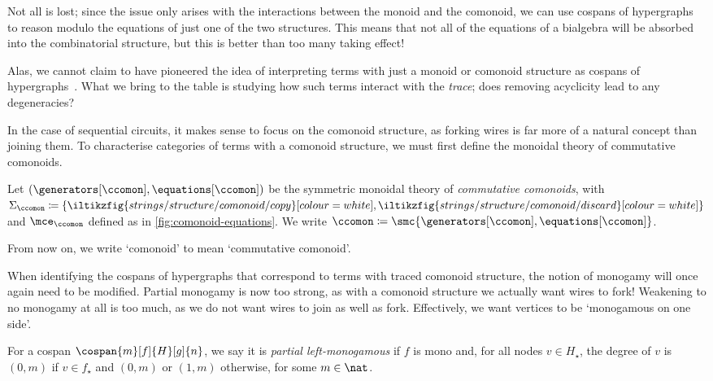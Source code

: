 Not all is lost; since the issue only arises with the interactions between the
monoid and the comonoid, we can use cospans of hypergraphs to reason modulo the
equations of just one of the two structures.
This means that not all of the equations of a bialgebra will be absorbed into
the combinatorial structure, but this is better than too many taking effect!

\begin{remark}
    Alas, we cannot claim to have pioneered the idea of interpreting terms with
    just a monoid or comonoid structure as cospans of
    hypergraphs~\cite{fritz2023free,milosavljevic2023string}.
    What we bring to the table is studying how such terms interact with the
    \emph{trace}; does removing acyclicity lead to any degeneracies?
\end{remark}

In the case of sequential circuits, it makes sense to focus on the comonoid
structure, as forking wires is far more of a natural concept than joining them.
To characterise categories of terms with a comonoid structure, we must first
define the monoidal theory of commutative comonoids.

\begin{definition}
    Let \((\generators[\ccomon], \equations[\ccomon])\) be the symmetric
    monoidal theory of \emph{commutative comonoids}, with \(
    \Sigma_{\ccomon} \coloneqq \{
    \iltikzfig{strings/structure/comonoid/copy}[colour=white],
    \iltikzfig{strings/structure/comonoid/discard}[colour=white]
    \}
    \) and \(\mce_{\ccomon}\) defined as in \cref{fig:comonoid-equations}.
    We write \(
    \ccomon \coloneqq \smc{\generators[\ccomon], \equations[\ccomon]}
    \).
\end{definition}



From now on, we write `comonoid' to mean `commutative comonoid'.

When identifying the cospans of hypergraphs that correspond to terms with traced
comonoid structure, the notion of monogamy will once again need to be modified.
Partial monogamy is now too strong, as with a comonoid structure we actually
want wires to fork!
Weakening to no monogamy at all is too much, as we do not want wires to join as
well as fork.
Effectively, we want vertices to be `monogamous on one side'.

\begin{definition}
    For a cospan \(\cospan{m}[f]{H}[g]{n}\), we say it is
    \emph{partial left-monogamous} if \(f\) is mono and, for all nodes
    \(v \in H_\star\), the degree of \(v\) is \((0,m)\) if \(v \in f_\star\) and
    \((0,m)\) or \((1,m)\) otherwise, for some \(m \in \nat\).
\end{definition}


